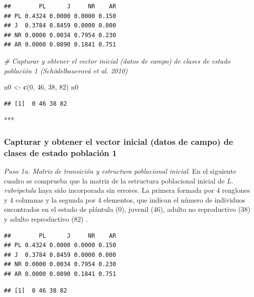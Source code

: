 \documentclass[
]{book}
\newenvironment{Shaded}{\begin{snugshade}}{\end{snugshade}}
\newcommand{\CommentTok}[1]{\textcolor[rgb]{0.56,0.35,0.01}{\textit{#1}}}
\newcommand{\DecValTok}[1]{\textcolor[rgb]{0.00,0.00,0.81}{#1}}
\newcommand{\FunctionTok}[1]{\textcolor[rgb]{0.13,0.29,0.53}{\textbf{#1}}}
\newcommand{\NormalTok}[1]{#1}
\newcommand{\OtherTok}[1]{\textcolor[rgb]{0.56,0.35,0.01}{#1}}
\theoremstyle{definition}
\theoremstyle{definition}
\theoremstyle{definition}
\theoremstyle{definition}
\theoremstyle{remark}
\begin{document}
\begin{verbatim}
##        PL      J     NR    AR
## PL 0.4324 0.0000 0.0000 0.150
## J  0.3784 0.8459 0.0000 0.000
## NR 0.0000 0.0034 0.7954 0.230
## AR 0.0000 0.0890 0.1841 0.751
\end{verbatim}

\begin{Shaded}
\begin{Highlighting}[]
\CommentTok{\# Capturar y obtener el vector inicial (datos de campo) de clases de estado población 1 (Schödelbauerová et al. 2010)}

\NormalTok{n0 }\OtherTok{\textless{}{-}} \FunctionTok{c}\NormalTok{(}\DecValTok{0}\NormalTok{, }\DecValTok{46}\NormalTok{, }\DecValTok{38}\NormalTok{, }\DecValTok{82}\NormalTok{) }
\NormalTok{n0}
\end{Highlighting}
\end{Shaded}

\begin{verbatim}
## [1]  0 46 38 82
\end{verbatim}

***

\subsubsection{Capturar y obtener el vector inicial (datos de campo) de clases de estado población 1}\label{capturar-y-obtener-el-vector-inicial-datos-de-campo-de-clases-de-estado-poblaciuxf3n-1}

\emph{Paso 1a. Matriz de transición y estructura poblacional inicial}. En el siguiente cuadro se comprueba que la matriz de la estructura poblacional inicial de \emph{L. rubripetala} haya sido incorporada sin errores. La primera formada por 4 renglones y 4 columnas y la segunda por 4 elementos, que indican el número de individuos encontrados en el estado de plántula (0), juvenil (46), adulto no reproductivo (38) y adulto reproductivo (82) \citep{tremblay2015stable, schodelbauerova2010prediction}.

\begin{verbatim}
##        PL      J     NR    AR
## PL 0.4324 0.0000 0.0000 0.150
## J  0.3784 0.8459 0.0000 0.000
## NR 0.0000 0.0034 0.7954 0.230
## AR 0.0000 0.0890 0.1841 0.751
\end{verbatim}

\begin{verbatim}
## [1]  0 46 38 82
\end{verbatim}
\end{document}
